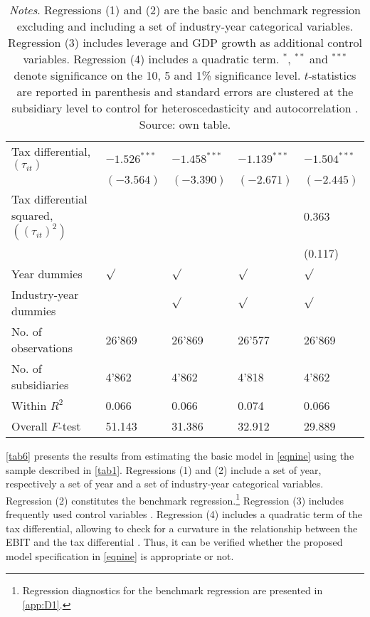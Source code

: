 \documentclass[10pt,twocolumn,oneside,cmyk]{article}
\begin{document}
\begin{table*}[t]
\begin{center}
\begin{tabularx}{0.75\textwidth}{l *{4}{Y}}
Tax differential, $(\tau_{it})$            		&$-1.526^{***}$ &$-1.458^{***}$&$-1.139^{***}$&$-1.504^{***}$\\
                	      						&$(-3.564)$   &$(-3.390)$   &$(-2.671)$ &$(-2.445)$ \\ 
Tax differential squared, $((\tau_{it})^2)$   	&                  &                 &			&0.363   \\
                         						&              &            &			&(0.117)   \\
Year dummies &$\sqrt{}$ &$\sqrt{}$ &$\sqrt{}$ &$\sqrt{}$\\
Industry-year dummies & &$\sqrt{}$ &$\sqrt{}$ &$\sqrt{}$\\
No. of observations                   &26'869           &26'869           &26'577           &26'869   \\
No. of subsidiaries             &4'862        &4'862      &4'818       & 4'862   \\
Within $R^2$                &0.066           &0.066           &0.074           &0.066   \\
Overall $F$-test                 &51.143       &   31.386      &    32.912    &      29.889\\				
    \bottomrule
   \end{tabularx}
 \caption*{\footnotesize{\textit{Notes}. Regressions (1) and (2) are the basic and benchmark regression excluding and including a set of industry-year categorical variables. Regression (3) includes leverage and GDP growth as additional control variables. Regression (4) includes a quadratic term. $^*$, $^{**}$ and $^{***}$ denote significance on the 10, 5 and 1\% significance level. $t$-statistics are reported in parenthesis and standard errors are clustered at the subsidiary level to control for heteroscedasticity and autocorrelation \parencite[285]{hoechle_robust_2007}. Source: own table.}}
 \end{center}
\end{table*}

\cref{tab6} presents the results from estimating the basic model in \cref{eqnine} using the sample described in \cref{tab1}. Regressions (1) and (2) include a set of year, respectively a set of year and a set of industry-year categorical variables. Regression (2) constitutes the benchmark regression.\footnote{Regression diagnostics for the benchmark regression are presented in \cref{app:D1}.} Regression (3) includes frequently used control variables \parencites[293]{weichenrieder_profit_2009}[8]{lohse_impact_2012}. Regression (4) includes a quadratic term of the tax differential, allowing to check for a curvature in the relationship between the EBIT and the tax differential \parencite[162-163]{hines_fiscal_1994}. Thus, it can be verified whether the proposed model specification in \cref{eqnine} is appropriate or not.
\end{document}
